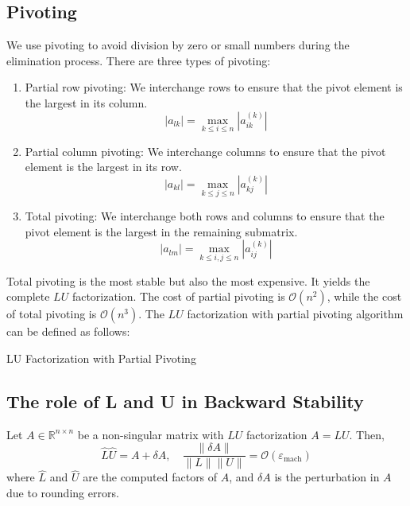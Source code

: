 \documentclass[11pt]{article}
\begin{document}
\subsection{Pivoting}
We use pivoting to avoid division by zero or small numbers during the elimination process. There are three types of pivoting:
\begin{enumerate}
    \item Partial row pivoting: We interchange rows to ensure that the pivot element is the largest in its column.
        \[|a_{lk}| = \max_{k \leq i \leq n} |a_{ik}^{(k)}|\]
    \item Partial column pivoting: We interchange columns to ensure that the pivot element is the largest in its row.
        \[|a_{kl}| = \max_{k \leq j \leq n} |a_{kj}^{(k)}|\]
    \item Total pivoting: We interchange both rows and columns to ensure that the pivot element is the largest in the remaining submatrix.
        \[|a_{lm}| = \max_{k \leq i,j \leq n} |a_{ij}^{(k)}|\]
\end{enumerate}
Total pivoting is the most stable but also the most expensive. It yields the complete \(LU\) factorization. The cost of partial pivoting is \(\mathcal{O}(n^2)\), while the cost of total pivoting is \(\mathcal{O}(n^3)\).
\vskip 0.5cm
The \(LU\) factorization with partial pivoting algorithm can be defined as follows:

\begin{algorithm}[H]
\caption{LU Factorization with Partial Pivoting}
\end{algorithm}
\pagebreak
\subsection{The role of L and U in Backward Stability}
Let \(A \in \mathbb{R}^{n \times n}\) be a non-singular matrix with \(LU\) factorization \(A = LU\). Then, 
\[\hat{L} \hat{U} = A + \delta A, \quad \frac{\|\delta A\|}{\|L\| \|U\|} = \mathcal{O}(\varepsilon_{\text{mach}})\]
where \(\hat{L}\) and \(\hat{U}\) are the computed factors of \(A\), and \(\delta A\) is the perturbation in \(A\) due to rounding errors.
\end{document}
